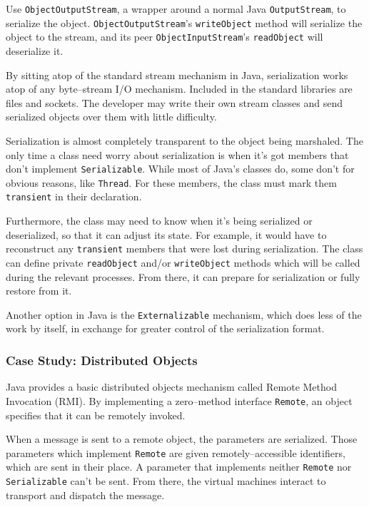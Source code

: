 	Use \texttt{Obj\-ect\-Outp\-utStr\-eam}\cite{java-api}, a wrapper around a normal Java \texttt{Out\-p\-ut\-Str\-eam}, to serialize the object.  \texttt{Obj\-ect\-Outp\-utStr\-eam}'s \texttt{writeObject} method will serialize the object to the stream, and its peer \texttt{Obj\-ect\-Inp\-utStr\-eam}'s \texttt{readObject} will deserialize it.

	By sitting atop of the standard stream mechanism in Java, serialization works atop of any byte--stream I/O mechanism.  Included in the standard libraries are files and sockets.  The developer may write their own stream classes and send serialized objects over them with little difficulty.

	Serialization is almost completely transparent to the object being marshaled.  The only time a class need worry about serialization is when it's got members that don't implement \texttt{Serializable}.  While most of Java's classes do, some don't for obvious reasons, like \texttt{Thread}.  For these members, the class must mark them \texttt{transient} in their declaration.

	Furthermore, the class may need to know when it's being serialized or deserialized, so that it can adjust its state.  For example, it would have to reconstruct any \texttt{transient} members that were lost during serialization.  The class can define private \texttt{readObject} and/or \texttt{writeObject} methods which will be called during the relevant processes.  From there, it can prepare for serialization or fully restore from it.

	Another option in Java is the \texttt{Externalizable} mechanism, which does less of the work by itself, in exchange for greater control of the serialization format.


\subsubsection{Case Study: Distributed Objects}
  Java provides a basic distributed objects mechanism called Remote Method Invocation (RMI)\cite{java-rmi}.  By implementing a zero--method interface \texttt{Remote}, an object specifies that it can be remotely invoked.  

  When a message is sent to a remote object, the parameters are serialized.  Those parameters which implement \texttt{Remote} are given remotely--accessible identifiers, which are sent in their place.  A parameter that implements neither \texttt{Remote} nor \texttt{Serializable} can't be sent.  From there, the virtual machines interact to transport and dispatch the message.


  
